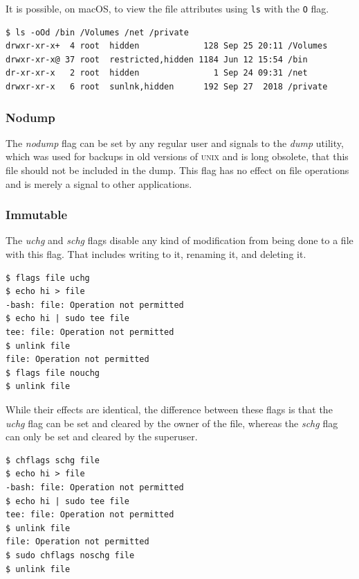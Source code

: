 \documentclass[a4paper]{article}
\begin{document}
It is possible, on macOS, to view the file attributes using \verb|ls| with the \verb|O| flag. 

\begin{verbatim}
$ ls -oOd /bin /Volumes /net /private
drwxr-xr-x+  4 root  hidden             128 Sep 25 20:11 /Volumes
drwxr-xr-x@ 37 root  restricted,hidden 1184 Jun 12 15:54 /bin
dr-xr-xr-x   2 root  hidden               1 Sep 24 09:31 /net
drwxr-xr-x   6 root  sunlnk,hidden      192 Sep 27  2018 /private  
\end{verbatim}


\subsubsection{Nodump}

The \emph{nodump} flag can be set by any regular user and signals to the \emph{dump} utility, which was used for backups in old versions of \textsc{unix} and is long obsolete, that this file should not be included in the dump. This flag has no effect on file operations and is merely a signal to other applications.

\subsubsection{Immutable}

The \emph{uchg} and \emph{schg} flags disable any kind of modification from being done to a file with this flag. That includes writing to it, renaming it, and deleting it. 

\begin{verbatim}
$ flags file uchg
$ echo hi > file
-bash: file: Operation not permitted
$ echo hi | sudo tee file
tee: file: Operation not permitted
$ unlink file
file: Operation not permitted
$ flags file nouchg
$ unlink file
\end{verbatim}
While their effects are identical, the difference between these flags is that the \emph{uchg} flag can be set and cleared by the owner of the file, whereas the \emph{schg} flag can only be set and cleared by the superuser.

\begin{verbatim}
$ chflags schg file
$ echo hi > file
-bash: file: Operation not permitted
$ echo hi | sudo tee file
tee: file: Operation not permitted
$ unlink file
file: Operation not permitted
$ sudo chflags noschg file
$ unlink file
\end{verbatim}
\end{document}
